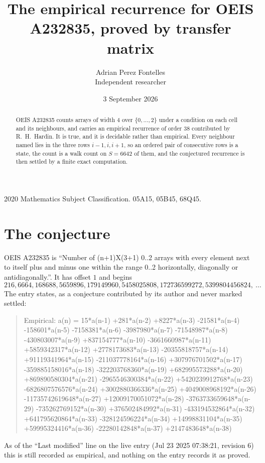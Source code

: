 \documentclass[11pt,a4paper]{article}
\title{The empirical recurrence for OEIS A232835, proved by transfer matrix}
\author{Adrian Perez Fontelles\\ \small Independent researcher}
\date{3 September 2026}
\theoremstyle{plain}
\theoremstyle{definition}
\begin{document}
\maketitle

\begin{abstract}
OEIS A232835 counts arrays of width $4$ over $\{0,\dots,2\}$ under a condition on each cell
and its neighbours, and carries an empirical recurrence of order $38$ contributed by
R.~H.~Hardin. It is true, and it is decidable rather than empirical. Every neighbour named lies
in the three rows $i-1,i,i+1$, so an ordered pair of consecutive rows is a state, the count is
a walk count on $S=6642$ of them, and the conjectured recurrence is then settled by a finite
exact computation.
\end{abstract}

\noindent\small 2020 Mathematics Subject Classification. 05A15, 05B45, 68Q45.\normalsize

\section{The conjecture}

OEIS A232835 is ``Number of (n+1)X(3+1) 0..2 arrays with every element next to itself plus and minus one within the range 0..2 horizontally, diagonally or antidiagonally.''. It has offset $1$ and begins
\[
216, 6664, 168688, 5659896, 179149960, 5458025808, 172736599272, 5399804456824,\ \dots
\]
The entry states, as a conjecture contributed by its author and never marked settled:
\begin{quote}
Empirical: a(n) = 15*a(n-1) +281*a(n-2) +8227*a(n-3) -21581*a(n-4) -158601*a(n-5) -7158381*a(n-6) -3987980*a(n-7) -71548987*a(n-8) -430803007*a(n-9) +837154777*a(n-10) -3661660987*a(n-11) +5859342317*a(n-12) +2778173683*a(n-13) -20355818757*a(n-14) +91119341964*a(n-15) -211037778164*a(n-16) +307976701502*a(n-17) -359885158016*a(n-18) -322203768360*a(n-19) +682995573288*a(n-20) +869890580304*a(n-21) -2965546300384*a(n-22) +5420239912768*a(n-23) -6826807576576*a(n-24) +3002880366336*a(n-25) +4049008968192*a(n-26) -11735742619648*a(n-27) +12009170051072*a(n-28) -3763733659648*a(n-29) -735262769152*a(n-30) +376502484992*a(n-31) -433194532864*a(n-32) +641795620864*a(n-33) -328124596224*a(n-34) +14998831104*a(n-35) +59995324416*a(n-36) -22280142848*a(n-37) +2147483648*a(n-38)
\end{quote}
As of the ``Last modified'' line on the live entry (Jul 23 2025 07:38:21, revision 6) this is still
recorded as empirical, and nothing on the entry records it as proved.
\end{document}
